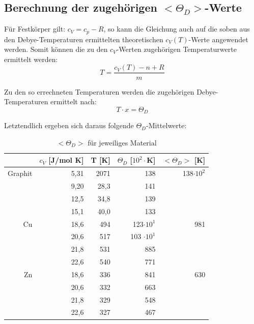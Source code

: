\documentclass[12pt,a4paper,titlepage,headinclude,bibtotoc]{scrartcl}
\begin{document}
\FloatBarrier

\subsection{Berechnung der zugehörigen $<\Theta_D>$-Werte }


Für Festkörper gilt: $c_V =c_p -R$, so kann die Gleichung auch auf die soben aus den Debye-Temperaturen ermittelten theoretischen $c_V(T)$-Werte angewendet werden. Somit können die zu den $c_V$-Werten zugehörigen Temperaturwerte ermittelt werden:\\

\begin{equation}
T= \frac{c_V(T) -n +R}{m}
\end{equation}

Zu den so errechneten Temperaturen werden die zugehörigen Debye-Temperaturen ermittelt nach:\\

\begin{equation}
T \cdot x = \Theta_D
\end{equation}

Letztendlich ergeben sich daraus folgende $\Theta_D$-Mittelwerte:\\


\begin{table} [h]
\centering
\caption{$<\Theta_D>$ für jeweiliges Material}
\begin{tabular} {r | r|  r |r |r}
& $c_V$ [J/mol K] & T	[K] &$\Theta_D$ [$10^2\cdot$K]	&$<\Theta_D>$ [K]\\
\hline
Graphit &5,31	&2071	&138&	138$\cdot10^2$\\
        &9,20	&28,3&	141\\	
        &12,5&	34,8&	139\\	
        &15,1	&40,0	&133\\
\hline						
Cu &18,6 &	494 &	123$\cdot 10^1$ &	981\\
&20,6 &	517&	103 $\cdot 10^1$&\\
&21,8&	531 &	885& \\
&22,6 &	540 &	771&\\	
\hline			
Zn &18,6 &	336 &	841 &	630  \\
&20,6 &	332 &	663&  \\	
&21,8 &	329 &	548& \\	
&22,6 &	327& 	467& \\

\end{tabular}
\end{table}
\end{document}
